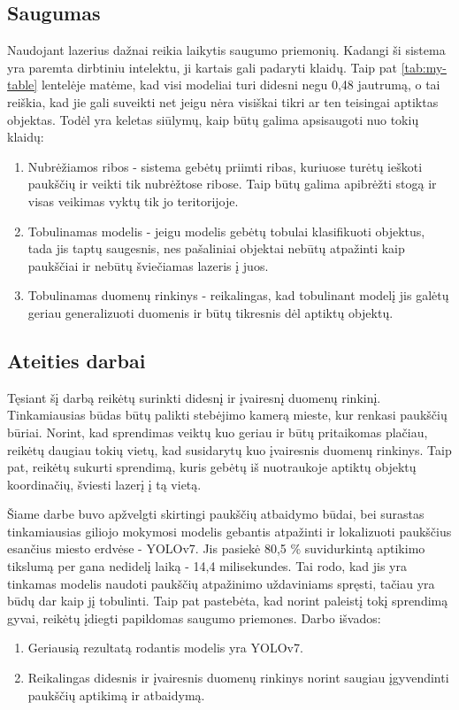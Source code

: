 \documentclass{VUMIFPSkursinis}
\begin{document}
\subsection{Saugumas}
Naudojant lazerius dažnai reikia laikytis saugumo priemonių. Kadangi ši sistema yra paremta dirbtiniu intelektu, ji kartais gali padaryti klaidų. Taip pat \ref{tab:my-table} lentelėje matėme, kad visi modeliai turi didesni negu 0,48 jautrumą, o tai reiškia, kad jie gali suveikti net jeigu nėra visiškai tikri ar ten teisingai aptiktas objektas. Todėl yra keletas siūlymų, kaip būtų galima apsisaugoti nuo tokių klaidų:

\begin{enumerate}
    \item Nubrėžiamos ribos - sistema gebėtų priimti ribas, kuriuose turėtų ieškoti paukščių ir veikti tik nubrėžtose ribose. Taip būtų galima apibrėžti stogą ir visas veikimas vyktų tik jo teritorijoje.
    \item Tobulinamas modelis - jeigu modelis gebėtų tobulai klasifikuoti objektus, tada jis taptų saugesnis, nes pašaliniai objektai nebūtų atpažinti kaip paukščiai ir nebūtų šviečiamas lazeris į juos.
    \item Tobulinamas duomenų rinkinys - reikalingas, kad tobulinant modelį jis galėtų geriau generalizuoti duomenis ir būtų tikresnis dėl aptiktų objektų.
\end{enumerate}

\subsection{Ateities darbai}
Tęsiant šį darbą reikėtų surinkti didesnį ir įvairesnį duomenų rinkinį. Tinkamiausias būdas būtų palikti stebėjimo kamerą mieste, kur renkasi paukščių būriai. Norint, kad sprendimas veiktų kuo geriau ir būtų pritaikomas plačiau, reikėtų daugiau tokių vietų, kad susidarytų kuo įvairesnis duomenų rinkinys. Taip pat, reikėtų sukurti sprendimą, kuris gebėtų iš nuotraukoje aptiktų objektų koordinačių, šviesti lazerį į tą vietą.


Šiame darbe buvo apžvelgti skirtingi paukščių atbaidymo būdai, bei surastas tinkamiausias giliojo mokymosi modelis gebantis atpažinti ir lokalizuoti paukščius esančius miesto erdvėse - YOLOv7. Jis pasiekė 80,5 \% suvidurkintą aptikimo tikslumą per gana nedidelį laiką - 14,4 milisekundes. Tai rodo, kad jis yra tinkamas modelis naudoti paukščių atpažinimo uždaviniams spręsti, tačiau yra būdų dar kaip jį tobulinti. Taip pat pastebėta, kad norint paleistį tokį sprendimą gyvai, reikėtų įdiegti papildomas saugumo priemones. Darbo išvados:
\begin{enumerate}
    \item Geriausią rezultatą rodantis modelis yra YOLOv7.
    \item Reikalingas didesnis ir įvairesnis duomenų rinkinys norint saugiau įgyvendinti paukščių aptikimą ir atbaidymą.
\end{enumerate}
\end{document}
